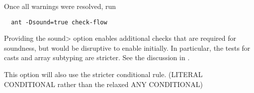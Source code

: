 Once all warnings were resolved, run 

\begin{Verbatim}
  ant -Dsound=true check-flow
\end{Verbatim}

\noindent
Providing the \<sound> option enables additional checks that are
required for soundness, but would be disruptive to enable initially.
In particular, the tests for casts and array subtyping are stricter.
See the discussion in .

This option will also use the stricter conditional rule. (LITERAL
\flowsto{} CONDITIONAL rather than the relaxed ANY \flowsto{} CONDITIONAL)



